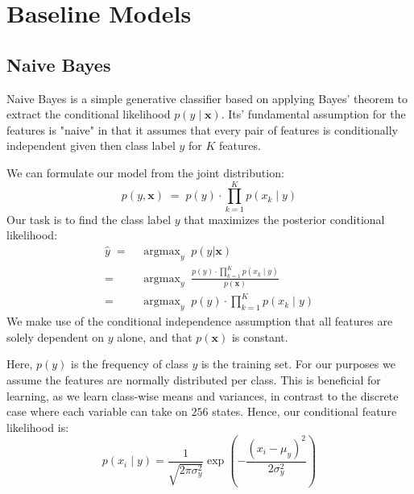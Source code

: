 \documentclass{article}
\DeclareMathOperator*{\argmax}{argmax}
\begin{document}

\section{Baseline Models}
\label{sec:baseline-models}
\subsection{Naive Bayes}
\label{sec:NB}
Naive Bayes is a simple generative classifier based on applying Bayes' theorem
to extract the conditional likelihood $p(y \mid \mathbf{x})$. Its' fundamental
assumption for the features is "naive" in that it assumes that every pair of
features is conditionally independent given then class label $y$ for $K$ features.

We can formulate our model from the joint distribution:
\begin{equation}
    p(y, \mathbf{x}) \; = \; p(y) \cdot \prod_{k=1}^K p(x_k \mid y)
\end{equation}
Our task is to find the class label $y$ that maximizes the posterior conditional
likelihood:
\begin{equation}
  \begin{aligned}
    \hat{y} \; = \; & \argmax_y \; p(y | \mathbf{x}) \\
    = \; & \argmax_y \; \frac{p(y) \cdot \prod_{k=1}^K p(x_k \mid y)}{p(\mathbf{x})} \\
    = \; & \argmax_y \; p(y) \cdot \prod_{k=1}^K p(x_k \mid y)
  \end{aligned}
\end{equation}
We make use of the conditional independence assumption that all features
are solely dependent on $y$ alone, and that $p(\mathbf{x})$ is constant.

Here, $p(y)$ is the frequency of class $y$ is the training set.
For our purposes we assume the features are normally distributed per class.
This is beneficial for learning, as we learn class-wise means and variances,
in contrast to the discrete case where each variable can take on $256$ states.
Hence, our conditional feature likelihood is:
\begin{equation}
  p(x_i \mid y) = \frac{1}{\sqrt{2\pi\sigma^2_y}} \exp\left(-\frac{(x_i - \mu_y)^2}{2\sigma^2_y}\right)
\end{equation}
\end{document}
